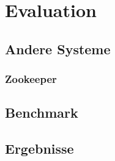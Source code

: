 \chapter{Evaluation}
\label{eval}

\section{Andere Systeme}

\subsection{Zookeeper}

\section{Benchmark}

\section{Ergebnisse}
